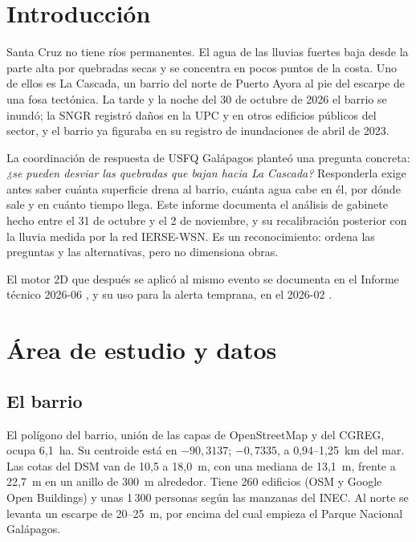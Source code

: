 \documentclass{sosg-informe}
\begin{document}
\section{Introducción}

Santa Cruz no tiene ríos permanentes. El agua de las lluvias fuertes baja desde la parte alta por quebradas secas y se concentra en pocos puntos de la costa. Uno de ellos es La Cascada, un barrio del norte de Puerto Ayora al pie del escarpe de una fosa tectónica. La tarde y la noche del 30 de octubre de 2026 el barrio se inundó; la SNGR registró daños en la UPC y en otros edificios públicos del sector, y el barrio ya figuraba en su registro de inundaciones de abril de 2023.

La coordinación de respuesta de USFQ Galápagos planteó una pregunta concreta: \emph{¿se pueden desviar las quebradas que bajan hacia La Cascada?} Responderla exige antes saber cuánta superficie drena al barrio, cuánta agua cabe en él, por dónde sale y en cuánto tiempo llega. Este informe documenta el análisis de gabinete hecho entre el 31 de octubre y el 2 de noviembre, y su recalibración posterior con la lluvia medida por la red IERSE-WSN. Es un reconocimiento: ordena las preguntas y las alternativas, pero no dimensiona obras.

El motor 2D que después se aplicó al mismo evento se documenta en el Informe técnico 2026-06 \citep{sosg202606}, y su uso para la alerta temprana, en el 2026-02 \citep{sosg202602}.

\section{Área de estudio y datos}

\subsection{El barrio}
El polígono del barrio, unión de las capas de OpenStreetMap y del CGREG, ocupa 6,1~ha. Su centroide está en $-90,3137$; $-0,7335$, a 0,94--1,25~km del mar. Las cotas del DSM van de 10,5 a 18,0~m, con una mediana de 13,1~m, frente a 22,7~m en un anillo de 300~m alrededor. Tiene 260 edificios (OSM y Google Open Buildings) y unas 1\,300 personas según las manzanas del INEC. Al norte se levanta un escarpe de 20--25~m, por encima del cual empieza el Parque Nacional Galápagos.
\end{document}
